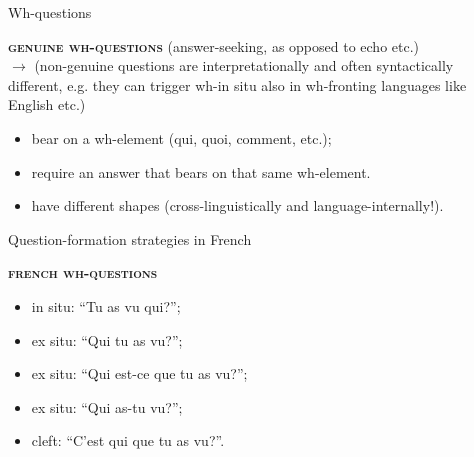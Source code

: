 \documentclass[lesson_slides]{subfiles}
\begin{document}
\begin{frame}[c]{Wh-questions}

    \noindent \textbf{\textsc{genuine wh-questions}} \pause (answer-seeking, as opposed to echo etc.)\\ \pause
    $\longrightarrow$ (non-genuine questions are interpretationally and often syntactically different, e.g. they can trigger wh-in situ also in wh-fronting languages like English etc.)
    \begin{itemize}
        \item[\ding{227}] bear on a wh-element (qui, quoi, comment, etc.); \pause
        \item[\ding{227}] require an answer that bears on that same wh-element. \pause 
        \item[\ding{227}] have different shapes \pause (cross-linguistically and language-internally!).
    \end{itemize}
\end{frame}
\begin{frame}[c]{Question-formation strategies in French}

    \noindent \textbf{\textsc{french wh-questions}} \pause
    \begin{itemize}
        \item[\ding{227}] in situ: “Tu as vu qui?”; \pause
        \item[\ding{227}] ex situ: “Qui tu as vu?”; \pause 
        \item[\ding{227}] ex situ: “Qui est-ce que tu as vu?”; \pause 
        \item[\ding{227}] ex situ: “Qui as-tu vu?”; \pause 
        \item[\ding{227}] cleft: “C’est qui que tu as vu?”.
    \end{itemize}
   
\end{frame}
\end{document}
